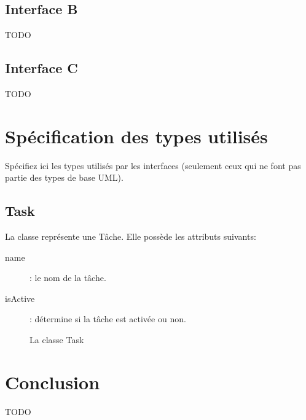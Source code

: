 		\subsection{Interface B}
TODO
	
		\subsection{Interface C}
TODO


	\section{Spécification des types utilisés}

Spécifiez ici les types utilisés par les interfaces (seulement ceux qui ne font pas partie des types de base UML).

		\subsection{Task}

	La classe  représente une Tâche. Elle possède les attributs suivants:
	\begin{description}
		\item[name]: le nom de la tâche.
		\item[isActive]: détermine si la tâche est activée ou non.
	\end{description}

\begin{figure}[htbp]
	\centering
	\caption{La classe Task}
	\label{fig:taks}
\end{figure}


	\section{Conclusion}
TODO
